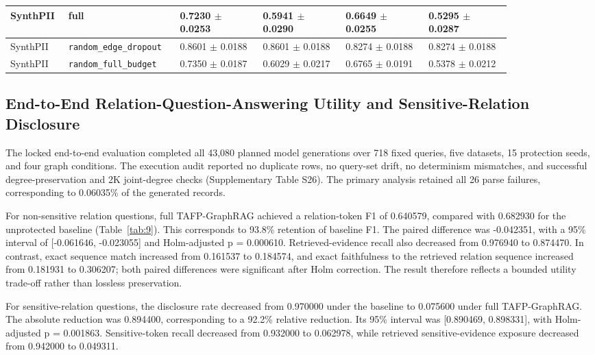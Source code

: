 \documentclass[preprint,12pt]{elsarticle}
\begin{document}
\begin{landscape}
\begin{longtable}{|L{0.08\linewidth}|L{0.17\linewidth}|C{0.15\linewidth}|C{0.15\linewidth}|C{0.15\linewidth}|C{0.15\linewidth}|}
SynthPII & full & 0.7230 $\pm$ 0.0253 & 0.5941 $\pm$ 0.0290 & 0.6649 $\pm$ 0.0255 & 0.5295 $\pm$ 0.0287 \\ \hline
SynthPII & \nolinkurl{random_edge_dropout} & 0.8601 $\pm$ 0.0188 & 0.8601 $\pm$ 0.0188 & 0.8274 $\pm$ 0.0188 & 0.8274 $\pm$ 0.0188 \\ \hline
SynthPII & \nolinkurl{random_full_budget} & 0.7350 $\pm$ 0.0187 & 0.6029 $\pm$ 0.0217 & 0.6765 $\pm$ 0.0191 & 0.5378 $\pm$ 0.0212 \\ \hline
\end{longtable}
\endgroup
\end{landscape}

\subsection{End-to-End Relation-Question-Answering Utility and Sensitive-Relation Disclosure}
The locked end-to-end evaluation completed all 43,080 planned model generations over 718 fixed queries, five datasets, 15 protection seeds, and four graph conditions. The execution audit reported no duplicate rows, no query-set drift, no determinism mismatches, and successful degree-preservation and 2K joint-degree checks (Supplementary Table S26). The primary analysis retained all 26 parse failures, corresponding to 0.06035\% of the generated records.

For non-sensitive relation questions, full TAFP-GraphRAG achieved a relation-token F1 of 0.640579, compared with 0.682930 for the unprotected baseline (Table~\ref{tab:9}). This corresponds to 93.8\% retention of baseline F1. The paired difference was -0.042351, with a 95\% interval of [-0.061646, -0.023055] and Holm-adjusted p = 0.000610. Retrieved-evidence recall also decreased from 0.976940 to 0.874470. In contrast, exact sequence match increased from 0.161537 to 0.184574, and exact faithfulness to the retrieved relation sequence increased from 0.181931 to 0.306207; both paired differences were significant after Holm correction. The result therefore reflects a bounded utility trade-off rather than lossless preservation.

For sensitive-relation questions, the disclosure rate decreased from 0.970000 under the baseline to 0.075600 under full TAFP-GraphRAG. The absolute reduction was 0.894400, corresponding to a 92.2\% relative reduction. Its 95\% interval was [0.890469, 0.898331], with Holm-adjusted p = 0.001863. Sensitive-token recall decreased from 0.932000 to 0.062978, while retrieved sensitive-evidence exposure decreased from 0.942000 to 0.049311.
\end{document}

